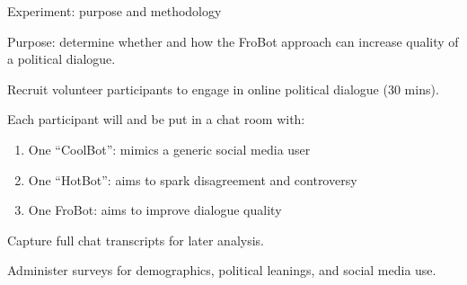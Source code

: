 \documentclass[12pt]{beamer}
\begin{document}
\begin{frame}[c]{Experiment: purpose and methodology}

Purpose: determine whether and how the FroBot approach can increase quality of a political dialogue.

\pause
Recruit volunteer participants to engage in online political dialogue (30 mins). 
\pause

Each participant will and be put in a chat room with:

\begin{enumerate}
\itemsep.1em
\item One ``CoolBot'': mimics a generic social media user
\item One ``HotBot'': aims to spark disagreement and controversy
\item One FroBot: aims to improve dialogue quality
\end{enumerate}

\pause
Capture full chat transcripts for later analysis.

\pause
Administer surveys for demographics, political leanings, and social media use.

\end{frame}
\end{document}
